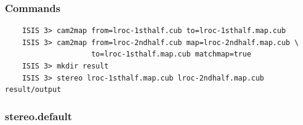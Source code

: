% 
% 

\subsubsection*{Commands}

\begin{verbatim}
    ISIS 3> cam2map from=lroc-1sthalf.cub to=lroc-1sthalf.map.cub
    ISIS 3> cam2map from=lroc-2ndhalf.cub map=lroc-2ndhalf.map.cub \
                    to=lroc-1sthalf.map.cub matchmap=true
    ISIS 3> mkdir result
    ISIS 3> stereo lroc-1sthalf.map.cub lroc-2ndhalf.map.cub result/output
\end{verbatim}

\subsubsection*{stereo.default}

